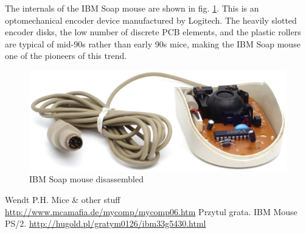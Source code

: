 \documentclass[11pt, a4paper]{article}
\begin{document}
The internals of the IBM Soap mouse are shown in fig. \ref{fig:IBMSoapInside}. This is an optomechanical encoder device manufactured by Logitech. The heavily slotted encoder disks, the low number of discrete PCB elements, and the plastic rollers are typical of mid-90s rather than early 90s mice, making the IBM Soap mouse one of the pioneers of this trend.

\begin{figure}[h]
    \centering
    \includegraphics[scale=0.7]{1992_ibm_soap_mouse/inside_60.jpg} 
    \caption{IBM Soap mouse disassembled}
    \label{fig:IBMSoapInside}
\end{figure}

\begin{thebibliography}{9}
 Wendt P.H. Mice \& other stuff \url{http://www.mcamafia.de/mycomp/mycomp06.htm}
 Przytul grata. IBM Mouse PS/2. \url{http://hugold.pl/gratym0126/ibm33g5430.html}
\end{thebibliography}
\end{document}
